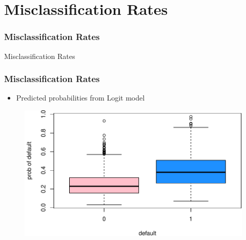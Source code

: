 \documentclass[
  shownotes,
  xcolor={svgnames},
  hyperref={colorlinks,citecolor=DarkBlue,linkcolor=DarkRed,urlcolor=DarkBlue}
  , aspectratio=169]{beamer}
\begin{document}
\section{Misclassification Rates}
\begin{frame}[fragile]
\frametitle{Misclassification Rates}


\centering
{\huge \textcolor{andesred}{Misclassification Rates}}


\end{frame}
\begin{frame}[fragile]
\frametitle{Misclassification Rates}

\begin{itemize}
  \item Predicted probabilities from Logit model
\end{itemize}

\begin{figure}[H] \centering
            \captionsetup{justification=centering}
              \includegraphics[scale=0.6]{figures/box_plots}                            
 \end{figure}


\end{frame}
\end{document}
